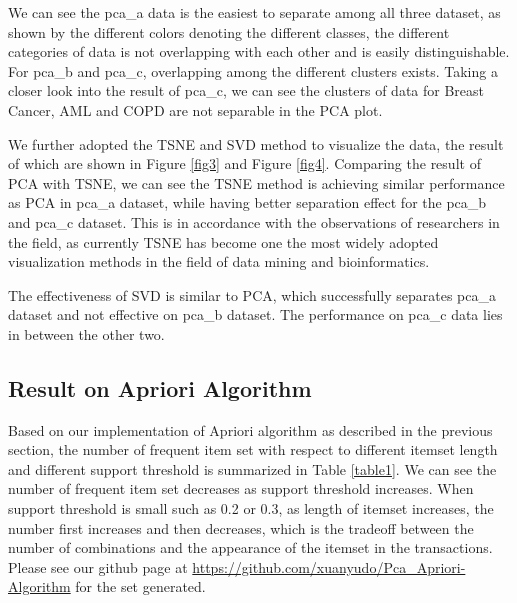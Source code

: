 \documentclass[fleqn]{llncs}
\begin{document}
We can see the pca\_a data is the easiest to separate among all three dataset, as shown by the different colors denoting the different classes, the different categories of data is not overlapping with each other and is easily distinguishable. For pca\_b and pca\_c, overlapping among the different clusters exists. Taking a closer look into the result of pca\_c, we can see the clusters of data for Breast Cancer, AML and COPD are not separable in the PCA plot.

We further adopted the TSNE and SVD method to visualize the data, the result of which are shown in Figure \ref{fig3} and Figure \ref{fig4}. Comparing the result of PCA with TSNE, we can see the TSNE method is achieving similar performance as PCA in pca\_a dataset, while having better separation effect for the pca\_b and pca\_c dataset. This is in accordance with the observations of researchers in the field, as currently TSNE has become one the most widely adopted visualization methods in the field of data mining and bioinformatics.

The effectiveness of SVD is similar to PCA, which successfully separates pca\_a dataset and not effective on pca\_b dataset. The performance on pca\_c data lies in between the other two.


\subsection{Result on Apriori Algorithm} Based on our implementation of Apriori algorithm as described in the previous section, the number of frequent item set with respect to different itemset length and different support threshold is summarized in Table \ref{table1}. We can see the number of frequent item set decreases as support threshold increases. When support threshold is small such as 0.2 or 0.3, as length of itemset increases, the number first increases and then decreases, which is the tradeoff between the number of combinations and the appearance of the itemset in the transactions. Please see our github page at \url{https://github.com/xuanyudo/Pca_Apriori-Algorithm} for the set generated.
\end{document}
